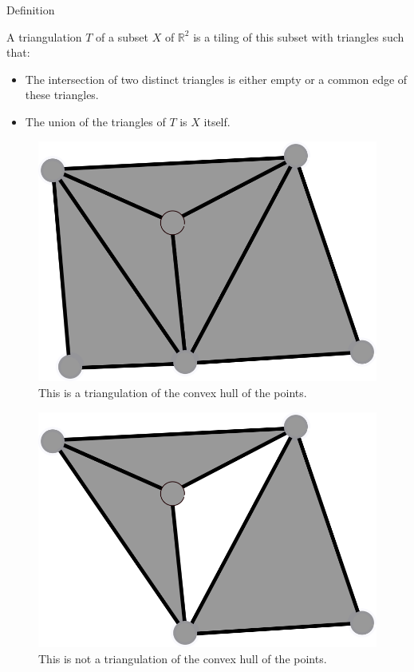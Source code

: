 \documentclass[18pt]{beamer}
\begin{document}
\begin{frame}{Definition}

 A triangulation $T$ of a subset $X$ of $\mathbb{R}^2$ is a tiling of this subset with triangles such
that:
\begin{itemize}
 \item<2-> The intersection of two distinct triangles is either empty or a common edge of these triangles.
 \item<4-> The union of the triangles of $T$ is $X$ itself.
\end{itemize}

\begin{overprint}
\begin{figure}
  \centering
  \includegraphics[scale=1.5]{Trig1}
  \caption{\label{Trig1} This is a triangulation of the convex hull of the points.}
\end{figure}

\begin{figure}
  \centering
  \includegraphics[scale=1.5]{NotTrig1}
  \caption{\label{NotTrig1} This is not a triangulation of the convex hull of the points.}
\end{figure}


\end{overprint}
\end{frame}
\end{document}
